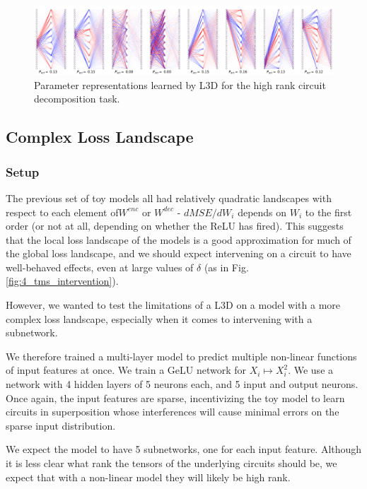 \documentclass{article}
\theoremstyle{plain}
\theoremstyle{definition}
\theoremstyle{remark}
\begin{document}
\begin{figure}[htbp]
    \centerline{\includegraphics[width=\textwidth]{../figures/7_high_rank_decomposition.pdf}}
    \centering
    \caption{Parameter representations learned by L3D for the high rank circuit decomposition task.}\label{fig:7_high_rank_decomposition}
\end{figure}


\subsection{Complex Loss Landscape}


\subsubsection{Setup}

The previous set of toy models all had relatively quadratic landscapes with respect to each element of$W^{enc}$ or $W^{dec}$ - $dMSE/dW_i$ depends on $W_i$ to the first order (or not at all, depending on whether the ReLU has fired). This suggests that the local loss landscape of the models is a good approximation for much of the global loss landscape, and we should expect intervening on a circuit to have well-behaved effects, even at large values of $\delta$ (as in Fig. \ref{fig:4_tms_intervention}). 

However, we wanted to test the limitations of a L3D on a model with a more complex loss landscape, especially when it comes to intervening with a subnetwork.

We therefore trained a multi-layer model to predict multiple non-linear functions of input features at once. We train a GeLU network for $X_i \mapsto X_i^2$. We use a network with 4 hidden layers of 5 neurons each, and 5 input and output neurons. Once again, the input features are sparse, incentivizing the toy model to learn circuits in superposition whose interferences will cause minimal errors on the sparse input distribution. 

We expect the model to have 5 subnetworks, one for each input feature. Although it is less clear what rank the tensors of the underlying circuits should be, we expect that with a non-linear model they will likely be high rank. 
\end{document}
